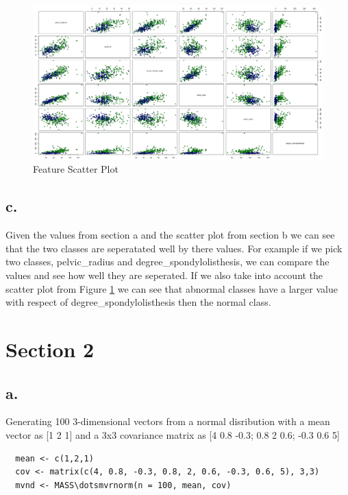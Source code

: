 \documentclass{report}
\begin{document}
\begin{figure}[h!]
  \includegraphics[width=\linewidth]{FeatureScatterPlot.png}
  \caption{Feature Scatter Plot}
  \label{fig:FeatureScatterPlot}
\end{figure}

\section{c.}

Given the values from section a and the scatter plot from section b we can see that the two classes are seperatated well by there values. For example if we pick two classes, pelvic\_radius and degree\_spondylolisthesis, we can compare the values and see how well they are seperated. If we also take into account the scatter plot from Figure \ref{fig:FeatureScatterPlot} we can see that abnormal classes have a larger value with respect of degree\_spondylolisthesis then the normal class.

\chapter{Section 2}

\section{a.}

Generating 100 3-dimensional vectors from a normal disribution with a mean vector as [1 2 1] and a 3x3 covariance matrix as [4  0.8 -0.3; 0.8 2 0.6; -0.3 0.6 5]

\begin{verbatim}
  mean <- c(1,2,1)
  cov <- matrix(c(4, 0.8, -0.3, 0.8, 2, 0.6, -0.3, 0.6, 5), 3,3)
  mvnd <- MASS\dotsmvrnorm(n = 100, mean, cov)
\end{verbatim}
\end{document}
